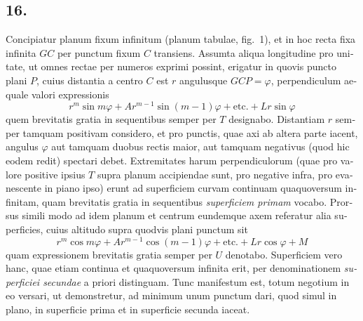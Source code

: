 \documentclass[12pt,a4paper]{article}
\begin{document}
\begin{otherlanguage}{latin}
\subsection*{16.}
Concipiatur planum fixum infinitum (planum tabulae, fig.~1), et in hoc recta fixa infinita $GC$ per punctum fixum $C$ transiens. Assumta aliqua longitudine pro unitate, ut omnes rectae per numeros exprimi possint, erigatur in quovis puncto plani $P$, cuius distantia a centro $C$ est $r$ angulusque $GCP=\varphi$, perpendiculum aequale valori expressionis
\[r^{m}\sin m\varphi+Ar^{m-1}\sin(m-1)\varphi+\text{etc.}+Lr\sin\varphi\]
quem brevitatis gratia in sequentibus semper per $T$ designabo. Distantiam $r$ semper tamquam positivam considero, et pro punctis, quae axi ab altera parte iacent, angulus $\varphi$ aut tamquam duobus rectis maior, aut tamquam negativus (quod hic eodem redit) spectari debet. Extremitates harum perpendiculorum (quae pro valore positive ipsius $T$ supra planum accipiendae sunt, pro negative infra, pro evanescente in piano ipso) erunt ad superficiem curvam continuam quaquoversum infinitam, quam brevitatis gratia in sequentibus \textit{superficiem primam} vocabo. Prorsus simili modo ad idem planum et centrum eundemque axem referatur alia superficies, cuius altitudo supra quodvis plani punctum sit
\[r^{m}\cos m\varphi+Ar^{m-1}\cos(m-1)\varphi+\text{etc.}+Lr\cos\varphi+M\]
quam expressionem brevitatis gratia semper per $U$ denotabo. Superficiem vero hanc, quae etiam continua et quaquoversum infinita erit, per denominationem \textit{superficiei secundae} a priori distinguam. Tunc manifestum est, totum negotium in eo versari, ut demonstretur, ad minimum unum punctum dari, quod simul in plano, in superficie prima et in superficie secunda iaceat.


\end{otherlanguage}
\end{document}
